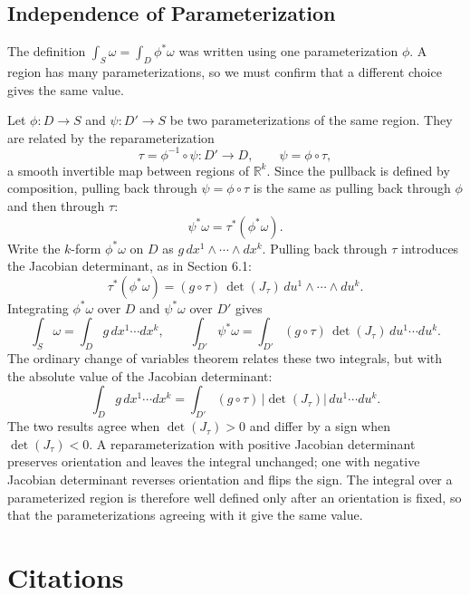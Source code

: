 \documentclass[12pt]{article}
\newcommand{\R}{\mathbb{R}}
\begin{document}
\subsection{Independence of Parameterization}

The definition $\int_S \omega = \int_D \phi^*\omega$ was written using one parameterization $\phi$. A region has many parameterizations, so we must confirm that a different choice gives the same value.

Let $\phi: D \to S$ and $\psi: D' \to S$ be two parameterizations of the same region. They are related by the reparameterization
\[
\tau = \phi^{-1} \circ \psi : D' \to D, \qquad \psi = \phi \circ \tau,
\]
a smooth invertible map between regions of $\R^k$. Since the pullback is defined by composition, pulling back through $\psi = \phi \circ \tau$ is the same as pulling back through $\phi$ and then through $\tau$:
\[
\psi^*\omega = \tau^*(\phi^*\omega).
\]
Write the $k$-form $\phi^*\omega$ on $D$ as $g\,dx^1 \wedge \cdots \wedge dx^k$. Pulling back through $\tau$ introduces the Jacobian determinant, as in Section 6.1:
\[
\tau^*(\phi^*\omega) = (g \circ \tau)\,\det(J_\tau)\,du^1 \wedge \cdots \wedge du^k.
\]
Integrating $\phi^*\omega$ over $D$ and $\psi^*\omega$ over $D'$ gives
\[
\int_S \omega = \int_D g\,dx^1 \cdots dx^k, \qquad \int_{D'} \psi^*\omega = \int_{D'} (g \circ \tau)\,\det(J_\tau)\,du^1 \cdots du^k.
\]
The ordinary change of variables theorem relates these two integrals, but with the absolute value of the Jacobian determinant:
\[
\int_D g\,dx^1 \cdots dx^k = \int_{D'} (g \circ \tau)\,|\det(J_\tau)|\,du^1 \cdots du^k.
\]
The two results agree when $\det(J_\tau) > 0$ and differ by a sign when $\det(J_\tau) < 0$. A reparameterization with positive Jacobian determinant preserves orientation and leaves the integral unchanged; one with negative Jacobian determinant reverses orientation and flips the sign. The integral over a parameterized region is therefore well defined only after an orientation is fixed, so that the parameterizations agreeing with it give the same value.



\section {Citations}
\nocite{*}
\printbibliography
\end{document}
